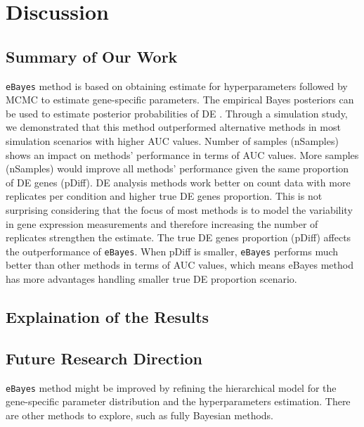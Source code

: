 \chapter{Discussion}

\section{Summary of Our Work}

\texttt{eBayes} method is based on obtaining estimate for hyperparameters followed by MCMC to estimate gene-specific parameters. The empirical Bayes posteriors can be used to estimate posterior probabilities of DE . Through a simulation study, we demonstrated that this method outperformed alternative methods in most simulation scenarios with higher AUC values. Number of samples (nSamples) shows an impact on methods' performance in terms of AUC values. More samples (nSamples) would improve all methods' performance given the same proportion of DE genes (pDiff). DE analysis methods work better on count data with more replicates per condition and higher true DE genes proportion. This is not surprising considering that the focus of most methods is to model the variability in gene expression measurements and therefore increasing the number of replicates strengthen the estimate. The true DE genes proportion (pDiff) affects the outperformance of \texttt{eBayes}. When pDiff is smaller, \texttt{eBayes} performs much better than other methods in terms of AUC values, which means eBayes method has more advantages handling smaller true DE proportion scenario.

\section{Explaination of the Results}


\section{Future Research Direction}

\texttt{eBayes} method might be improved by refining the hierarchical model for the gene-specific parameter distribution and the hyperparameters estimation. There are other methods to explore, such as fully Bayesian methods. 